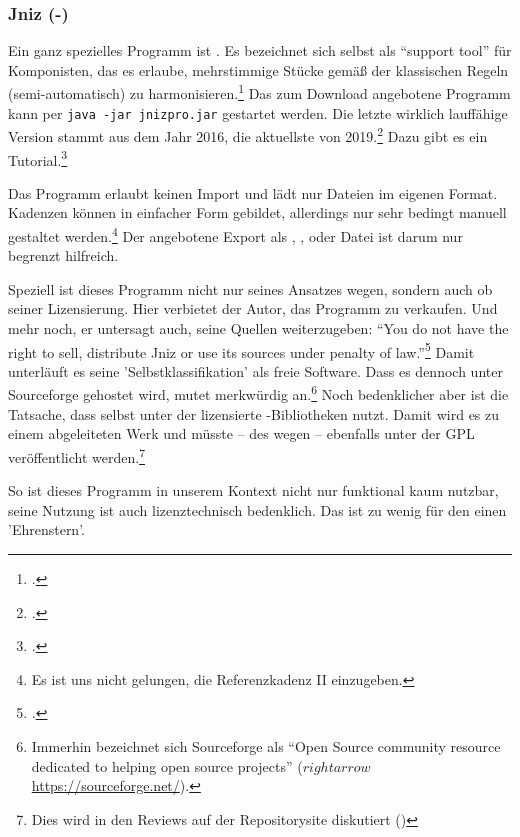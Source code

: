 %
%
%

\subsubsection{Jniz (-)}

\label{Jniz}Ein ganz spezielles Programm ist . Es bezeichnet sich
selbst als \enquote{support tool} für Komponisten, das es erlaube, mehrstimmige
Stücke gemäß der klassischen Regeln (semi-automatisch) zu
harmonisieren.\footcite[vgl.][\nopage wp]{Grandjean2019a} Das zum Download
angebotene Programm kann per \texttt{java -jar jnizpro.jar} gestartet werden.
Die letzte wirklich lauffähige Version stammt aus dem Jahr 2016, die aktuellste
von 2019.\footcite[vgl.][\nopage wp]{Jniz2019b} Dazu gibt es ein
Tutorial.\footcite[vgl.][\nopage wp]{Grandjean2019c}

Das Programm erlaubt keinen Import und lädt nur Dateien im eigenen Format.
Kadenzen können in einfacher Form gebildet, allerdings nur sehr bedingt manuell
gestaltet werden.\footnote{Es ist uns nicht gelungen, die Referenzkadenz II
einzugeben.} Der angebotene Export als , ,
 oder Datei ist darum nur begrenzt hilfreich.

Speziell ist dieses Programm nicht nur seines Ansatzes wegen, sondern auch ob
seiner Lizensierung. Hier verbietet der Autor, das Programm zu verkaufen. Und
mehr noch, er untersagt auch, seine Quellen weiterzugeben: \enquote{You do not
have the right to sell, distribute Jniz or use its sources under penalty of
law.}\footcite[vgl.][\nopage wp]{Grandjean2019b} Damit unterläuft es seine
'Selbstklassifikation' als freie Software. Dass es dennoch unter Sourceforge
gehostet wird, mutet merkwürdig an.\footnote{Immerhin bezeichnet sich
Sourceforge als \enquote{Open Source community resource dedicated to helping
open source projects} ($rightarrow$ \href{https://sourceforge.net/}
{https://sourceforge.net/}).} Noch bedenklicher aber ist die Tatsache, dass
 selbst unter der  lizensierte -Bibliotheken
nutzt. Damit wird es zu einem abgeleiteten Werk und müsste -- des
 wegen -- ebenfalls unter der GPL veröffentlicht
werden.\footnote{Dies wird in den Reviews auf der Repositorysite diskutiert
(\cite[vgl.][\nopage wp]{Jniz2019a})}

So ist dieses Programm in unserem Kontext nicht nur funktional kaum nutzbar,
seine Nutzung ist auch lizenztechnisch bedenklich. Das ist zu wenig für den
einen 'Ehrenstern'.



%
